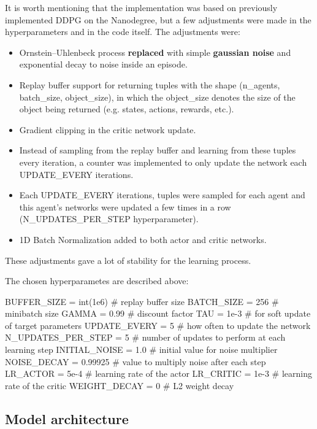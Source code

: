 \documentclass{article}
\begin{document}
It is worth mentioning that the implementation was based on previously implemented DDPG on the Nanodegree, but a few adjustments were made in the hyperparameters and in the code itself. The adjustments were:

\begin{itemize}
    \item Ornstein–Uhlenbeck process \textbf{replaced} with simple \textbf{gaussian noise} and exponential decay to noise inside an episode.
    \item Replay buffer support for returning tuples with the shape (n\_agents, batch\_size, object\_size), in which the object\_size denotes the size of the object being returned (e.g.  states, actions, rewards, etc.).
    \item Gradient clipping in the critic network update.
    \item Instead of sampling from the replay buffer and learning from these tuples every iteration, a counter was implemented to only update the network each UPDATE\_EVERY iterations.
    \item Each UPDATE\_EVERY iterations, tuples were sampled for each agent and this agent's networks were updated a few times in a row (N\_UPDATES\_PER\_STEP hyperparameter).
    \item 1D Batch Normalization added to both actor and critic networks.
\end{itemize}

These adjustments gave a lot of stability for the learning process.

The chosen hyperparametes are described above:

\begin{code}[Python]
BUFFER_SIZE = int(1e6)    # replay buffer size
BATCH_SIZE = 256          # minibatch size
GAMMA = 0.99              # discount factor
TAU = 1e-3                # for soft update of target parameters
UPDATE_EVERY = 5          # how often to update the network
N_UPDATES_PER_STEP = 5    # number of updates to perform at each learning step
INITIAL_NOISE = 1.0       # initial value for noise multiplier
NOISE_DECAY = 0.99925     # value to multiply noise after each step
LR_ACTOR = 5e-4           # learning rate of the actor
LR_CRITIC = 1e-3          # learning rate of the critic
WEIGHT_DECAY = 0          # L2 weight decay
\end{code}

\subsection{Model architecture}
\end{document}
